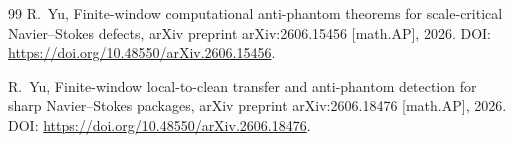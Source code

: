 \documentclass[11pt]{article}
\numberwithin{equation}{section}
\begin{document}
\begin{thebibliography}{99}
R.~Yu,
\newblock Finite-window computational anti-phantom theorems for scale-critical Navier--Stokes defects,
\newblock arXiv preprint arXiv:2606.15456 [math.AP], 2026.
\newblock DOI: \url{https://doi.org/10.48550/arXiv.2606.15456}.

R.~Yu,
\newblock Finite-window local-to-clean transfer and anti-phantom detection for sharp Navier--Stokes packages,
\newblock arXiv preprint arXiv:2606.18476 [math.AP], 2026.
\newblock DOI: \url{https://doi.org/10.48550/arXiv.2606.18476}.

\end{thebibliography}
\end{document}
